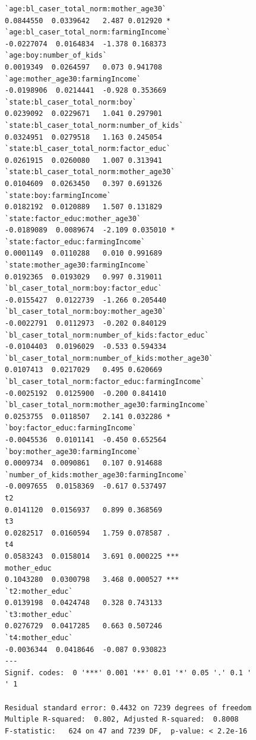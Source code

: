 \documentclass{article}
\begin{document}
\begin{figure}[H]
\begin{lstlisting}[style=RstyleCommentSmall, caption=CATE with Controls selected by LASSO]
`age:bl_caser_total_norm:mother_age30`             0.0844550  0.0339642   2.487 0.012920 *  
`age:bl_caser_total_norm:farmingIncome`           -0.0227074  0.0164834  -1.378 0.168373    
`age:boy:number_of_kids`                           0.0019349  0.0264597   0.073 0.941708    
`age:mother_age30:farmingIncome`                  -0.0198906  0.0214441  -0.928 0.353669    
`state:bl_caser_total_norm:boy`                    0.0239092  0.0229671   1.041 0.297901    
`state:bl_caser_total_norm:number_of_kids`         0.0324951  0.0279518   1.163 0.245054    
`state:bl_caser_total_norm:factor_educ`            0.0261915  0.0260080   1.007 0.313941    
`state:bl_caser_total_norm:mother_age30`           0.0104609  0.0263450   0.397 0.691326    
`state:boy:farmingIncome`                          0.0182192  0.0120889   1.507 0.131829    
`state:factor_educ:mother_age30`                  -0.0189089  0.0089674  -2.109 0.035010 *  
`state:factor_educ:farmingIncome`                  0.0001149  0.0110288   0.010 0.991689    
`state:mother_age30:farmingIncome`                 0.0192365  0.0193029   0.997 0.319011    
`bl_caser_total_norm:boy:factor_educ`             -0.0155427  0.0122739  -1.266 0.205440    
`bl_caser_total_norm:boy:mother_age30`            -0.0022791  0.0112973  -0.202 0.840129    
`bl_caser_total_norm:number_of_kids:factor_educ`  -0.0104403  0.0196029  -0.533 0.594334    
`bl_caser_total_norm:number_of_kids:mother_age30`  0.0107413  0.0217029   0.495 0.620669    
`bl_caser_total_norm:factor_educ:farmingIncome`   -0.0025192  0.0125900  -0.200 0.841410    
`bl_caser_total_norm:mother_age30:farmingIncome`   0.0253755  0.0118507   2.141 0.032286 *  
`boy:factor_educ:farmingIncome`                   -0.0045536  0.0101141  -0.450 0.652564    
`boy:mother_age30:farmingIncome`                   0.0009734  0.0090861   0.107 0.914688    
`number_of_kids:mother_age30:farmingIncome`       -0.0097655  0.0158369  -0.617 0.537497    
t2                                                 0.0141120  0.0156937   0.899 0.368569    
t3                                                 0.0282517  0.0160594   1.759 0.078587 .  
t4                                                 0.0583243  0.0158014   3.691 0.000225 ***
mother_educ                                        0.1043280  0.0300798   3.468 0.000527 ***
`t2:mother_educ`                                   0.0139198  0.0424748   0.328 0.743133    
`t3:mother_educ`                                   0.0276729  0.0417285   0.663 0.507246    
`t4:mother_educ`                                  -0.0036344  0.0418646  -0.087 0.930823    
---
Signif. codes:  0 '***' 0.001 '**' 0.01 '*' 0.05 '.' 0.1 ' ' 1

Residual standard error: 0.4432 on 7239 degrees of freedom
Multiple R-squared:  0.802,	Adjusted R-squared:  0.8008 
F-statistic:   624 on 47 and 7239 DF,  p-value: < 2.2e-16
\end{lstlisting}
\end{figure}
\end{document}
